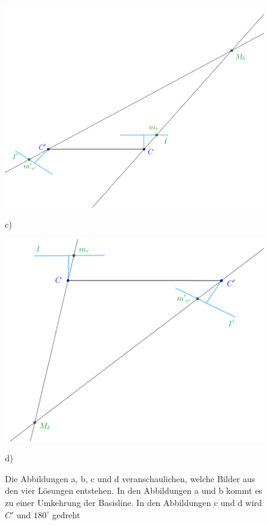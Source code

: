 \begin{figure}[!htb]
	\includegraphics[width=\linewidth]{images/P_Solution_three.png}
	\caption{c)}
	\label{fig:T_3}
	\endminipage\hfill
	\includegraphics[width=\linewidth]{images/P_Solution_four.png}
	\caption{d)}
	\label{fig:T_4}
	\endminipage\hfill
	\caption{Die Abbildungen a, b, c und d veranschaulichen, welche Bilder aus den vier Lösungen entstehen. In den Abbildungen a und b kommt es zu einer Umkehrung der Basisline. In den Abbildungen c und d wird $C'$ und $180^\circ$ gedreht}
\end{figure}
\pagebreak


